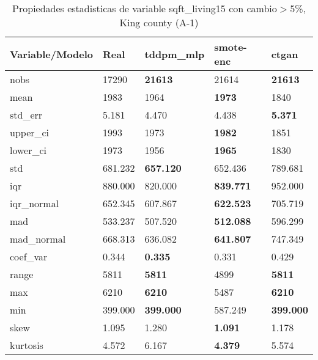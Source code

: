 \begin{table}[H]
\centering
\fontsize{8}{14}\selectfont
\caption{Propiedades estadisticas de variable sqft\_living15 con cambio\ensuremath{>}5\%, King county (A-1)}
\label{table-stats-king county-a-1-sqft_living15-short}
\begin{tabular}{|l|m{10em}|m{10em}|m{10em}|m{10em}|}
\hline
 \rowcolor[gray]{0.8}
Variable/Modelo & Real & tddpm\_mlp & smote-enc & ctgan \\
\hline nobs & 17290 & \bfseries 21613 & \cellcolor[rgb]{0.9, 0.54, 0.52} 21614 & \bfseries 21613 \\
\hline mean & 1983 & 1964 & \bfseries 1973 & \cellcolor[rgb]{0.9, 0.54, 0.52} 1840 \\
\hline std\_err & 5.181 & 4.470 & \cellcolor[rgb]{0.9, 0.54, 0.52} 4.438 & \bfseries 5.371 \\
\hline upper\_ci & 1993 & 1973 & \bfseries 1982 & \cellcolor[rgb]{0.9, 0.54, 0.52} 1851 \\
\hline lower\_ci & 1973 & 1956 & \bfseries 1965 & \cellcolor[rgb]{0.9, 0.54, 0.52} 1830 \\
\hline std & 681.232 & \bfseries 657.120 & 652.436 & \cellcolor[rgb]{0.9, 0.54, 0.52} 789.681 \\
\hline iqr & 880.000 & 820.000 & \bfseries 839.771 & \cellcolor[rgb]{0.9, 0.54, 0.52} 952.000 \\
\hline iqr\_normal & 652.345 & 607.867 & \bfseries 622.523 & \cellcolor[rgb]{0.9, 0.54, 0.52} 705.719 \\
\hline mad & 533.237 & 507.520 & \bfseries 512.088 & \cellcolor[rgb]{0.9, 0.54, 0.52} 596.299 \\
\hline mad\_normal & 668.313 & 636.082 & \bfseries 641.807 & \cellcolor[rgb]{0.9, 0.54, 0.52} 747.349 \\
\hline coef\_var & 0.344 & \bfseries 0.335 & 0.331 & \cellcolor[rgb]{0.9, 0.54, 0.52} 0.429 \\
\hline range & 5811 & \bfseries 5811 & \cellcolor[rgb]{0.9, 0.54, 0.52} 4899 & \bfseries 5811 \\
\hline max & 6210 & \bfseries 6210 & \cellcolor[rgb]{0.9, 0.54, 0.52} 5487 & \bfseries 6210 \\
\hline min & 399.000 & \bfseries 399.000 & \cellcolor[rgb]{0.9, 0.54, 0.52} 587.249 & \bfseries 399.000 \\
\hline skew & 1.095 & \cellcolor[rgb]{0.9, 0.54, 0.52} 1.280 & \bfseries 1.091 & 1.178 \\
\hline kurtosis & 4.572 & \cellcolor[rgb]{0.9, 0.54, 0.52} 6.167 & \bfseries 4.379 & 5.574 \\

\end{tabular}
\end{table}
